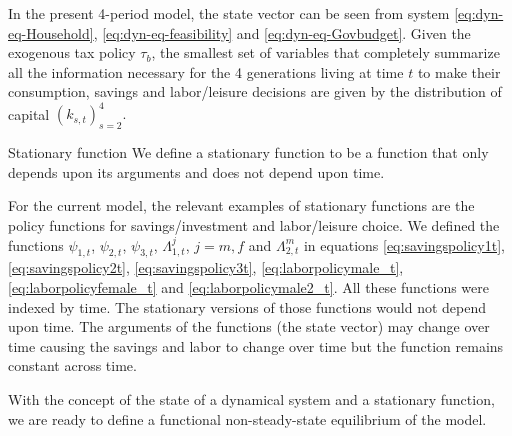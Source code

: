\documentclass[BufferStockTheory]{subfiles}
\begin{document}
In the present 4-period model, the state vector can be seen from system \eqref{eq:dyn-eq-Household}, \eqref{eq:dyn-eq-feasibility} and \eqref{eq:dyn-eq-Govbudget}. Given the exogenous tax policy 
$\tau_b$, the smallest set of variables that completely summarize all the information necessary for the 4 generations living at time $t$ to make their consumption, savings and labor/leisure decisions  are given by the distribution of capital $(k_{s,t})_{s=2}^4.$

\begin{definition}
	{Stationary function}
	We define a stationary function to be a function that only depends upon its arguments and does not depend upon time. 
\end{definition}

For the current model, the relevant examples of stationary functions are the policy functions for savings/investment and labor/leisure choice. 
We defined the functions $\psi_{1,t}$, $\psi_{2,t}$, $\psi_{3,t}$, $\Lambda_{1,t}^j$, $j=m,f$ and $\Lambda_{2,t}^m$ in equations \eqref{eq:savingspolicy1t}, \eqref{eq:savingspolicy2t}, \eqref{eq:savingspolicy3t}, \eqref{eq:laborpolicymale_t}, \eqref{eq:laborpolicyfemale_t} and
 \eqref{eq:laborpolicymale2_t}. All these functions were indexed by time. The stationary versions of those functions would not depend upon time. The arguments of the functions (the state vector) may change over time causing the savings and labor to change over time but the function remains constant across time. 

 With the concept of the state of a dynamical system and a stationary function, we are ready to define a functional non-steady-state equilibrium of the model. 
\end{document}
